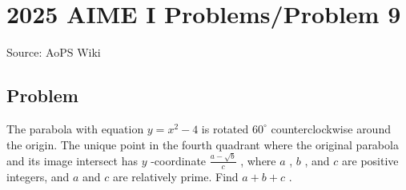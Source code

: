 \documentclass[12pt]{article}
\begin{document}
\section*{{2025 AIME I Problems/Problem 9}}
Source: AoPS Wiki

\subsection*{Problem}
The parabola with equation $y = x^2 - 4$ is rotated $60^\circ$ counterclockwise around the origin. The unique point in the fourth quadrant where the original parabola and its image intersect has $y$ -coordinate $\frac{a - \sqrt{b}}{c}$ , where $a$ , $b$ , and $c$ are positive integers, and $a$ and $c$ are relatively prime. Find $a + b + c$ .
\end{document}
